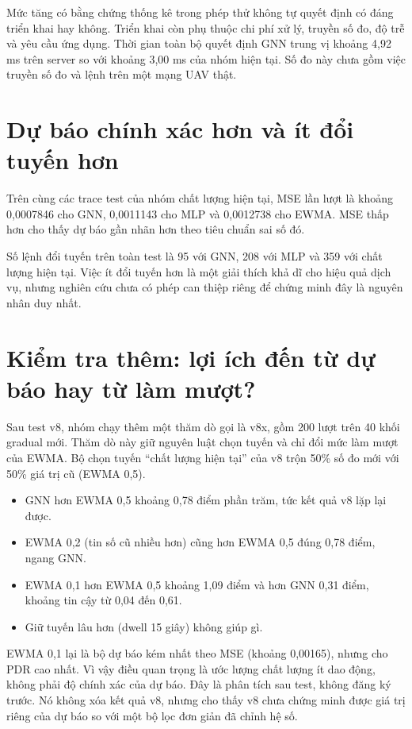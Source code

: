 Mức tăng có bằng chứng thống kê trong phép thử không tự quyết định có đáng triển khai hay không. Triển khai còn phụ thuộc chi phí xử lý, truyền số đo, độ trễ và yêu cầu ứng dụng. Thời gian toàn bộ quyết định GNN trung vị khoảng 4,92 ms trên server so với khoảng 3,00 ms của nhóm hiện tại. Số đo này chưa gồm việc truyền số đo và lệnh trên một mạng UAV thật.

\section{Dự báo chính xác hơn và ít đổi tuyến hơn}
Trên cùng các trace test của nhóm chất lượng hiện tại, MSE lần lượt là khoảng 0,0007846 cho GNN, 0,0011143 cho MLP và 0,0012738 cho EWMA. MSE thấp hơn cho thấy dự báo gần nhãn hơn theo tiêu chuẩn sai số đó.

Số lệnh đổi tuyến trên toàn test là 95 với GNN, 208 với MLP và 359 với chất lượng hiện tại. Việc ít đổi tuyến hơn là một giải thích khả dĩ cho hiệu quả dịch vụ, nhưng nghiên cứu chưa có phép can thiệp riêng để chứng minh đây là nguyên nhân duy nhất.

\section{Kiểm tra thêm: lợi ích đến từ dự báo hay từ làm mượt?}
Sau test v8, nhóm chạy thêm một thăm dò gọi là v8x, gồm 200 lượt trên 40 khối gradual mới. Thăm dò này giữ nguyên luật chọn tuyến và chỉ đổi mức làm mượt của EWMA. Bộ chọn tuyến ``chất lượng hiện tại'' của v8 trộn 50\% số đo mới với 50\% giá trị cũ (EWMA 0,5).
\begin{itemize}
\item GNN hơn EWMA 0,5 khoảng 0,78 điểm phần trăm, tức kết quả v8 lặp lại được.
\item EWMA 0,2 (tin số cũ nhiều hơn) cũng hơn EWMA 0,5 đúng 0,78 điểm, ngang GNN.
\item EWMA 0,1 hơn EWMA 0,5 khoảng 1,09 điểm và hơn GNN 0,31 điểm, khoảng tin cậy từ 0,04 đến 0,61.
\item Giữ tuyến lâu hơn (dwell 15 giây) không giúp gì.
\end{itemize}
EWMA 0,1 lại là bộ dự báo kém nhất theo MSE (khoảng 0,00165), nhưng cho PDR cao nhất. Vì vậy điều quan trọng là ước lượng chất lượng ít dao động, không phải độ chính xác của dự báo. Đây là phân tích sau test, không đăng ký trước. Nó không xóa kết quả v8, nhưng cho thấy v8 chưa chứng minh được giá trị riêng của dự báo so với một bộ lọc đơn giản đã chỉnh hệ số.

